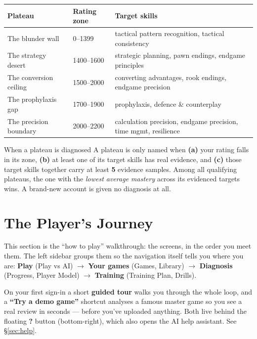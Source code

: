\documentclass[11pt]{article}
\begin{document}
\begin{center}
\tabnum
\begin{tabularx}{\linewidth}{@{}l l Y@{}}
\toprule
\textbf{Plateau} & \textbf{Rating zone} & \textbf{Target skills} \\
\midrule
The blunder wall & 0--1399 & tactical pattern recognition, tactical consistency \\
The strategy desert & 1400--1600 & strategic planning, pawn endings, endgame principles \\
The conversion ceiling & 1500--2000 & converting advantages, rook endings, endgame precision \\
The prophylaxis gap & 1700--1900 & prophylaxis, defence \& counterplay \\
The precision boundary & 2000--2200 & calculation precision, endgame precision, time mgmt, resilience \\
\bottomrule
\end{tabularx}
\end{center}

\begin{rulebox}{When a plateau is diagnosed}
A plateau is only named when \textbf{(a)} your rating falls in its zone,
\textbf{(b)} at least one of its target skills has real evidence, and
\textbf{(c)} those target skills together carry at least \textbf{5} evidence
samples. Among all qualifying plateaus, the one with the \emph{lowest average
mastery} across its evidenced targets wins. A brand-new account is given no
diagnosis at all.
\end{rulebox}

\section{The Player's Journey}

This section is the ``how to play'' walkthrough: the screens, in the order you
meet them. The left sidebar groups them so the navigation itself tells you where
you are: \textbf{Play} (Play vs AI) $\rightarrow$ \textbf{Your games} (Games,
Library) $\rightarrow$ \textbf{Diagnosis} (Progress, Player Model) $\rightarrow$
\textbf{Training} (Training Plan, Drills).

\begin{notebox}
On your first sign-in a short \textbf{guided tour} walks you through the whole
loop, and a \textbf{``Try a demo game''} shortcut analyses a famous master game
so you see a real review in seconds --- before you've uploaded anything. Both
live behind the floating \textbf{?} button (bottom-right), which also opens the
AI help assistant. See \S\ref{sec:help}.
\end{notebox}
\end{document}
